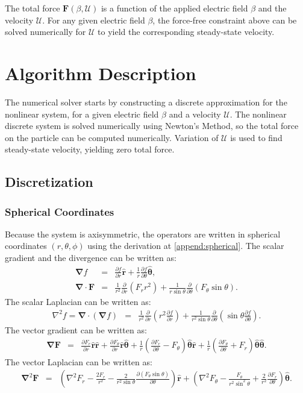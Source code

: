 \documentclass[final]{elsarticle}
\newcommand{\deriv}[2]{\frac{\partial #1}{\partial #2}}
\newcommand{\pars}[1]{\left(#1\right)}
\newcommand\Laplacian{\nabla^2}
\newcommand\bnabla{\boldsymbol{\nabla}}
\newcommand\bLaplacian{\boldsymbol{\nabla}^2}
\newcommand\bF{\boldsymbol{F}}
\newcommand\br{\boldsymbol{r}}
\newcommand\brhat{\hat{\br}}
\newcommand\btheta{\boldsymbol{\theta}}
\newcommand\bthetahat{\hat{\btheta}}
\newcommand\cU{\mathscr{U}}
\begin{document}
The total force $\bF(\beta, \cU)$ is a function of the applied electric field $\beta$ and
the velocity $\cU$.
For any given electric field $\beta$, the force-free constraint above 
can be solved numerically for $\cU$ to yield the corresponding steady-state velocity.

\section{Algorithm Description} \label{algorithm}
The numerical solver starts by constructing a discrete approximation for the nonlinear system,
for a given electric field $\beta$ and a velocity $\cU$. The nonlinear discrete system is
solved numerically using Newton's Method, so the total force on the particle can be computed
numerically. Variation of $\cU$ is used to find steady-state velocity, yielding zero total force.

\subsection{Discretization}
\subsubsection{Spherical Coordinates}
Because the system is axisymmetric, the operators are written in 
spherical coordinates $(r,\theta,\phi)$ 
using the derivation at \ref{append:spherical}.
The scalar gradient and the divergence can be written as:
\begin{eqnarray*}
\bnabla f &=& \deriv{f}{r}\brhat + \frac{1}{r}\deriv{f}{\theta}\bthetahat, \\
\bnabla \cdot \bF &=& \frac{1}{r^2}\deriv{}{r}\pars{F_r r^2 } + 
               \frac{1}{r \sin\theta}\deriv{}{\theta}\pars{F_\theta \sin\theta}.
\end{eqnarray*}
The scalar Laplacian can be written as:
\begin{eqnarray*}
\Laplacian f = \bnabla \cdot (\bnabla f)&=& 
 \frac{1}{r^2}\deriv{}{r}\pars{r^2 \deriv{f}{r}} + 
 \frac{1}{r^2 \sin\theta}\deriv{}{\theta}\pars{\sin\theta \deriv{f}{\theta}}.
\end{eqnarray*}
The vector gradient can be written as:
\begin{eqnarray*}
\bnabla \bF &=& \deriv{F_r}{r} \brhat \brhat + \deriv{F_\theta}{r} \brhat \bthetahat + 
\frac{1}{r}\pars{\deriv{F_r}{\theta} - F_\theta} \bthetahat \brhat + 
\frac{1}{r}\pars{\deriv{F_\theta}{\theta} + F_r} \bthetahat \bthetahat.
\end{eqnarray*}
The vector Laplacian can be written as:
\begin{eqnarray*}
\bLaplacian \bF &=& 
\left(\Laplacian F_r - \frac{2F_r}{r^2} - 
\frac{2}{r^2 \sin\theta} \deriv{\left(F_\theta \sin\theta \right)}{\theta}\right)\brhat
+ \left(\Laplacian F_\theta - \frac{F_\theta}{r^2 \sin^2\theta} + 
\frac{2}{r^2}\deriv{F_r}{\theta}\right) \bthetahat.
\end{eqnarray*}
\end{document}
